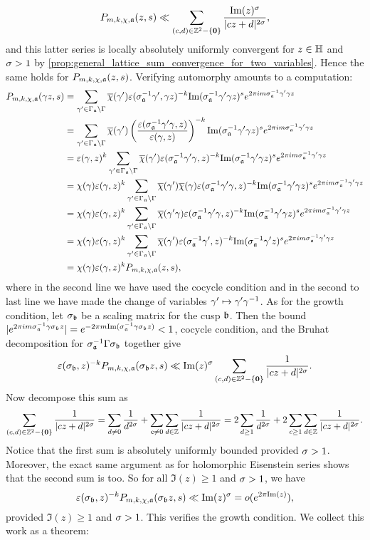     \[
      P_{m,k,\chi,\mathfrak{a}}(z,s) \ll \sum_{(c,d) \in \mathbb{Z}^{2}-\{\mathbf{0}\}}\frac{\mathrm{Im}(z)^{\sigma}}{|cz+d|^{2\sigma}},
    \]
    and this latter series is locally absolutely uniformly convergent for $z \in \mathbb{H}$ and $\sigma > 1$ by \cref{prop:general_lattice_sum_convergence_for_two_variables}. Hence the same holds for $P_{m,k,\chi,\mathfrak{a}}(z,s)$. Verifying automorphy amounts to a computation:
    \begin{align*}
      P_{m,k,\chi,\mathfrak{a}}(\gamma z,s) &= \sum_{\gamma' \in \Gamma_{\mathfrak{a}}\backslash\Gamma}\overline{\chi}(\gamma')\varepsilon(\sigma_{\mathfrak{a}}^{-1}\gamma',\gamma z)^{-k}\mathrm{Im}(\sigma_{\mathfrak{a}}^{-1}\gamma'\gamma z)^{s}e^{2\pi im\sigma_{\mathfrak{a}}^{-1}\gamma'\gamma z} \\
      &= \sum_{\gamma' \in \Gamma_{\mathfrak{a}}\backslash\Gamma}\overline{\chi}(\gamma')\left(\frac{\varepsilon(\sigma_{\mathfrak{a}}^{-1}\gamma'\gamma,z)}{\varepsilon(\gamma,z)}\right)^{-k}\mathrm{Im}(\sigma_{\mathfrak{a}}^{-1}\gamma'\gamma z)^{s}e^{2\pi im\sigma_{\mathfrak{a}}^{-1}\gamma'\gamma z} \\
      &= \varepsilon(\gamma,z)^{k}\sum_{\gamma' \in \Gamma_{\mathfrak{a}}\backslash\Gamma}\overline{\chi}(\gamma')\varepsilon(\sigma_{\mathfrak{a}}^{-1}\gamma'\gamma,z)^{-k}\mathrm{Im}(\sigma_{\mathfrak{a}}^{-1}\gamma'\gamma z)^{s}e^{2\pi im\sigma_{\mathfrak{a}}^{-1}\gamma'\gamma z} \\
      &= \chi(\gamma)\varepsilon(\gamma,z)^{k}\sum_{\gamma' \in \Gamma_{\mathfrak{a}}\backslash\Gamma}\overline{\chi}(\gamma')\overline{\chi}(\gamma)\varepsilon(\sigma_{\mathfrak{a}}^{-1}\gamma'\gamma,z)^{-k}\mathrm{Im}(\sigma_{\mathfrak{a}}^{-1}\gamma'\gamma z)^{s}e^{2\pi im\sigma_{\mathfrak{a}}^{-1}\gamma'\gamma z} \\
      &= \chi(\gamma)\varepsilon(\gamma,z)^{k}\sum_{\gamma' \in \Gamma_{\mathfrak{a}}\backslash\Gamma}\overline{\chi}(\gamma'\gamma)\varepsilon(\sigma_{\mathfrak{a}}^{-1}\gamma'\gamma,z)^{-k}\mathrm{Im}(\sigma_{\mathfrak{a}}^{-1}\gamma'\gamma z)^{s}e^{2\pi im\sigma_{\mathfrak{a}}^{-1}\gamma'\gamma z} \\
      &= \chi(\gamma)\varepsilon(\gamma,z)^{k}\sum_{\gamma' \in \Gamma_{\mathfrak{a}}\backslash\Gamma}\overline{\chi}(\gamma')\varepsilon(\sigma_{\mathfrak{a}}^{-1}\gamma',z)^{-k}\mathrm{Im}(\sigma_{\mathfrak{a}}^{-1}\gamma' z)^{s}e^{2\pi im\sigma_{\mathfrak{a}}^{-1}\gamma'\gamma z} \\
      &= \chi(\gamma)\varepsilon(\gamma,z)^{k}P_{m,k,\chi,\mathfrak{a}}(z,s),
    \end{align*}
    where in the second line we have used the cocycle condition and in the second to last line we have made the change of variables $\gamma' \mapsto \gamma'\gamma^{-1}$. As for the growth condition, let $\sigma_{\mathfrak{b}}$ be a scaling matrix for the cusp $\mathfrak{b}$. Then the bound $|e^{2\pi im\sigma_{\mathfrak{a}}^{-1}\gamma\sigma_{\mathfrak{b}}z}| = e^{-2\pi m\mathrm{Im}(\sigma_{\mathfrak{a}}^{-1}\gamma\sigma_{\mathfrak{b}}z)} < 1$, cocycle condition, and the Bruhat decomposition for $\sigma_{\mathfrak{a}}^{-1}\Gamma\sigma_{\mathfrak{b}}$ together give
    \[
      \varepsilon(\sigma_{\mathfrak{b}},z)^{-k}P_{m,k,\chi,\mathfrak{a}}(\sigma_{\mathfrak{b}}z,s) \ll \mathrm{Im}(z)^{\sigma}\sum_{(c,d) \in \mathbb{Z}^{2}-\{\mathbf{0}\}}\frac{1}{|cz+d|^{2\sigma}}.
    \]
    Now decompose this sum as
    \[
      \sum_{(c,d) \in \mathbb{Z}^{2}-\{\mathbf{0}\}}\frac{1}{|cz+d|^{2\sigma}} = \sum_{d \neq 0}\frac{1}{d^{2\sigma}}+\sum_{c \neq 0}\sum_{d \in \mathbb{Z}}\frac{1}{|cz+d|^{2\sigma}} = 2\sum_{d \ge 1}\frac{1}{d^{2\sigma}}+2\sum_{c \ge 1}\sum_{d \in \mathbb{Z}}\frac{1}{|cz+d|^{2\sigma}}.
    \]
    Notice that the first sum is absolutely uniformly bounded provided $\sigma > 1$. Moreover, the exact same argument as for holomorphic Eisenstein series shows that the second sum is too. So for all $\Im(z) \ge 1$ and $\sigma > 1$, we have
    \[
      \varepsilon(\sigma_{\mathfrak{b}},z)^{-k}P_{m,k,\chi,\mathfrak{a}}(\sigma_{\mathfrak{b}}z,s) \ll \mathrm{Im}(z)^{\sigma} = o(e^{2\pi\mathrm{Im}(z)}),
    \]
    provided $\Im(z) \ge 1$ and $\sigma > 1$. This verifies the growth condition. We collect this work as a theorem:

